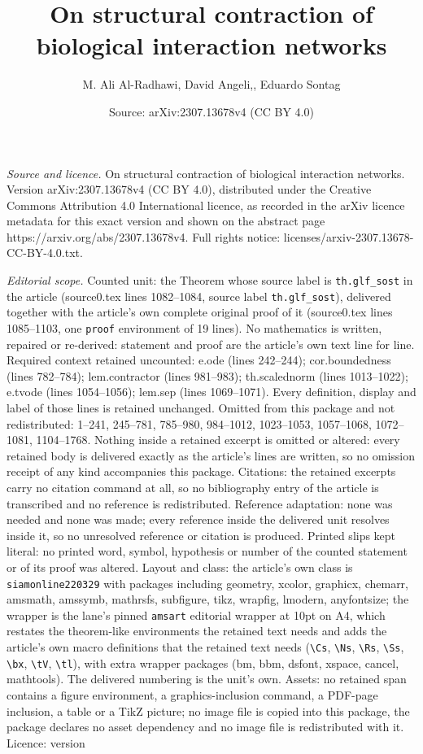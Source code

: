 \documentclass[10pt,a4paper]{amsart}
\title[On structural contraction of biological interaction networks]{On structural contraction of biological interaction networks}
\author{M. Ali Al-Radhawi, David Angeli,, Eduardo Sontag}
\date{Source: arXiv:2307.13678v4 (CC BY 4.0)}
\begin{document}
\maketitle

\noindent\emph{Source and licence.} On structural contraction of biological interaction networks. Version arXiv:2307.13678v4 (CC BY 4.0), distributed under the Creative Commons Attribution 4.0 International licence, as recorded in the arXiv licence metadata for this exact version and shown on the abstract page https://arxiv.org/abs/2307.13678v4. Full rights notice: licenses/arxiv-2307.13678-CC-BY-4.0.txt.\par\smallskip

\noindent\textit{Editorial scope.} Counted unit: the Theorem whose source label is \texttt{th.glf\_sost} in the article (source0.tex lines 1082--1084, source label \texttt{th.glf\_sost}), delivered together with the article's own complete original proof of it (source0.tex lines 1085--1103, one \texttt{proof} environment of 19 lines). No mathematics is written, repaired or re-derived: statement and proof are the article's own text line for line. Required context retained uncounted: e.ode (lines 242--244); cor.boundedness (lines 782--784); lem.contractor (lines 981--983); th.scalednorm (lines 1013--1022); e.tvode (lines 1054--1056); lem.sep (lines 1069--1071). Every definition, display and label of those lines is retained unchanged. Omitted from this package and not redistributed: 1--241, 245--781, 785--980, 984--1012, 1023--1053, 1057--1068, 1072--1081, 1104--1768. Nothing inside a retained excerpt is omitted or altered: every retained body is delivered exactly as the article's lines are written, so no omission receipt of any kind accompanies this package. Citations: the retained excerpts carry no citation command at all, so no bibliography entry of the article is transcribed and no reference is redistributed. Reference adaptation: none was needed and none was made; every reference inside the delivered unit resolves inside it, so no unresolved reference or citation is produced. Printed slips kept literal: no printed word, symbol, hypothesis or number of the counted statement or of its proof was altered. Layout and class: the article's own class is \texttt{siamonline220329} with packages including geometry, xcolor, graphicx, chemarr, amsmath, amssymb, mathrsfs, subfigure, tikz, wrapfig, lmodern, anyfontsize; the wrapper is the lane's pinned \texttt{amsart} editorial wrapper at 10pt on A4, which restates the theorem-like environments the retained text needs and adds the article's own macro definitions that the retained text needs (\texttt{\textbackslash Cs}, \texttt{\textbackslash Ns}, \texttt{\textbackslash Rs}, \texttt{\textbackslash Ss}, \texttt{\textbackslash bx}, \texttt{\textbackslash tV}, \texttt{\textbackslash tl}), with extra wrapper packages (bm, bbm, dsfont, xspace, cancel, mathtools). The delivered numbering is the unit's own. Assets: no retained span contains a figure environment, a graphics-inclusion command, a PDF-page inclusion, a table or a TikZ picture; no image file is copied into this package, the package declares no asset dependency and no image file is redistributed with it. Licence: version 
\end{document}

